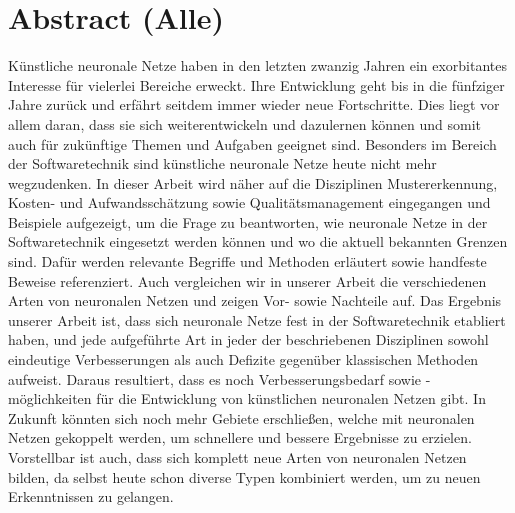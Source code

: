 \section*{Abstract (Alle)}
Künstliche neuronale Netze haben in den letzten zwanzig Jahren ein exorbitantes Interesse für vielerlei Bereiche erweckt. Ihre Entwicklung geht bis in die fünfziger Jahre zurück und erfährt seitdem immer wieder neue Fortschritte. Dies liegt vor allem daran, dass sie sich weiterentwickeln und dazulernen können und somit auch für zukünftige Themen und Aufgaben geeignet sind. Besonders im Bereich der Softwaretechnik sind künstliche neuronale Netze heute nicht mehr wegzudenken. In dieser Arbeit wird näher auf die Disziplinen Mustererkennung, Kosten- und Aufwandsschätzung sowie Qualitätsmanagement eingegangen und Beispiele aufgezeigt, um die Frage zu beantworten, wie neuronale Netze in der Softwaretechnik eingesetzt werden können und wo die aktuell bekannten Grenzen sind. Dafür werden relevante Begriffe und Methoden erläutert sowie handfeste Beweise referenziert. Auch vergleichen wir in unserer Arbeit die verschiedenen Arten von neuronalen Netzen und zeigen Vor- sowie Nachteile auf. Das Ergebnis unserer Arbeit ist, dass sich neuronale Netze fest in der Softwaretechnik etabliert haben, und jede aufgeführte Art in jeder der beschriebenen Disziplinen sowohl eindeutige Verbesserungen als auch Defizite gegenüber klassischen Methoden aufweist. Daraus resultiert, dass es noch Verbesserungsbedarf sowie -möglichkeiten für die Entwicklung von künstlichen neuronalen Netzen gibt. In Zukunft könnten sich noch mehr Gebiete erschließen, welche mit neuronalen Netzen gekoppelt werden, um schnellere und bessere Ergebnisse zu erzielen. Vorstellbar ist auch, dass sich komplett neue Arten von neuronalen Netzen bilden, da selbst heute schon diverse Typen kombiniert werden, um zu neuen Erkenntnissen zu gelangen.